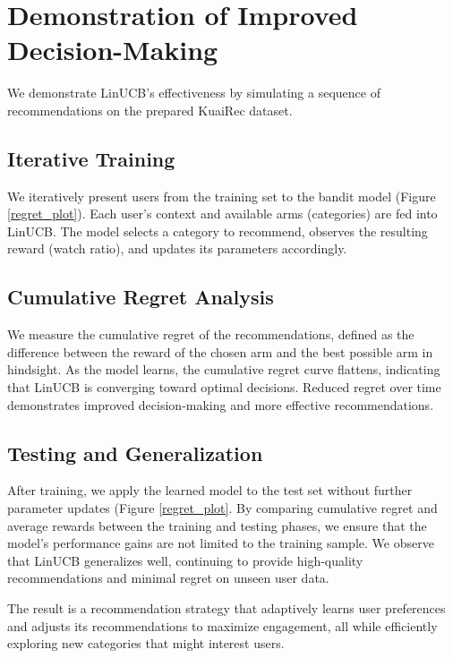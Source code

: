 \section{Demonstration of Improved Decision-Making}

We demonstrate LinUCB's effectiveness by simulating a sequence of recommendations on the prepared KuaiRec dataset.

\subsection{Iterative Training}

We iteratively present users from the training set to the bandit model (Figure \ref{regret_plot}). Each user's context and available arms (categories) are fed into LinUCB. The model selects a category to recommend, observes the resulting reward (watch ratio), and updates its parameters accordingly.
    
\subsection{Cumulative Regret Analysis}

We measure the cumulative regret of the recommendations, defined as the difference between the reward of the chosen arm and the best possible arm in hindsight. As the model learns, the cumulative regret curve flattens, indicating that LinUCB is converging toward optimal decisions. Reduced regret over time demonstrates improved decision-making and more effective recommendations.

\subsection{Testing and Generalization}

After training, we apply the learned model to the test set without further parameter updates (Figure \ref{regret_plot}. By comparing cumulative regret and average rewards between the training and testing phases, we ensure that the model's performance gains are not limited to the training sample. We observe that LinUCB generalizes well, continuing to provide high-quality recommendations and minimal regret on unseen user data.

The result is a recommendation strategy that adaptively learns user preferences and adjusts its recommendations to maximize engagement, all while efficiently exploring new categories that might interest users.